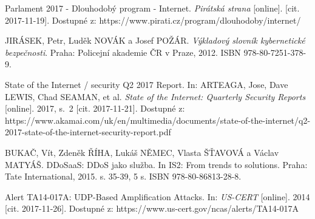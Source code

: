 

\begin{literatura}{99}

Parlament 2017 - Dlouhodobý program - Internet. \textit{Pirátská strana} [online]. [cit. 2017-11-19]. Dostupné z: https://www.pirati.cz/program/dlouhodoby/internet/

JIRÁSEK, Petr, Luděk NOVÁK a Josef POŽÁR. \textit{Výkladový slovník kybernetické bezpečnosti}. Praha: Policejní akademie ČR v Praze, 2012. ISBN 978-80-7251-378-9.

State of the Internet / security Q2 2017 Report. In: ARTEAGA, Jose, Dave LEWIS, Chad SEAMAN, et al. \textit{State of the Internet: Quarterly Security Reports} [online]. 2017, s.~2 [cit. 2017-11-21]. Dostupné z: https://www.akamai.com/uk/en/multimedia/documents/state-of-the-internet/q2-2017-state-of-the-internet-security-report.pdf

BUKAČ, Vít, Zdeněk ŘÍHA, Lukáš NĚMEC, Vlasta ŠŤAVOVÁ a Václav MATYÁŠ. DDoSaaS: DDoS jako služba. In IS2: From trends to solutions. Praha: Tate International, 2015. s. 35-39, 5 s. ISBN 978-80-86813-28-8.

Alert TA14-017A: UDP-Based Amplification Attacks. In: \textit{US-CERT} [online]. 2014 [cit. 2017-11-26]. Dostupné z: https://www.us-cert.gov/ncas/alerts/TA14-017A

\end{literatura}


%
%
%
